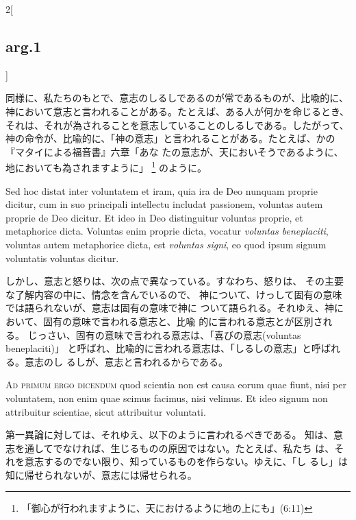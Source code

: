 \documentclass[paper=a4paper,fontsize=10pt,jafontsize=9pt,titlepage]{jlreq}
\begin{document}
\begin{paracol}{2}[\subsection{arg.1}]
\switchcolumn

同様に、私たちのもとで、意志のしるしであるのが常であるものが、比喩的に、
 神において意志と言われることがある。たとえば、ある人が何かを命じるとき、
 それは、それが為されることを意志していることのしるしである。したがって、
 神の命令が、比喩的に、「神の意志」と言われることがある。たとえば、かの
 『マタイによる福音書』六章「あな
 たの意志が、天においそうであるように、地においても為されますように」
 \footnote{「御心が行われますように、天におけるように地の上にも」(6:11)}
 のように。

\switchcolumn*


Sed hoc distat inter voluntatem et iram, quia ira
de Deo nunquam proprie dicitur, cum in suo principali intellectu
includat passionem, voluntas autem proprie de Deo dicitur. Et ideo in
Deo distinguitur voluntas proprie, et metaphorice dicta. Voluntas enim
proprie dicta, vocatur {\itshape voluntas beneplaciti}, voluntas autem metaphorice
dicta, est {\itshape voluntas signi}, eo quod ipsum signum voluntatis voluntas
dicitur.

\switchcolumn

しかし、意志と怒りは、次の点で異なっている。すなわち、怒りは、
 その主要な了解内容の中に、情念を含んでいるので、
 神について、けっして固有の意味では語られないが、意志は固有の意味で神に
 ついて語られる。それゆえ、神において、固有の意味で言われる意志と、比喩
 的に言われる意志とが区別される。
じっさい、固有の意味で言われる意志は、「喜びの意志(voluntas beneplaciti)」
 と呼ばれ、比喩的に言われる意志は、「しるしの意志」と呼ばれる。意志のし
 るしが、意志と言われるからである。

\switchcolumn*[\subsection{ad.1}]


{\scshape Ad primum ergo dicendum} quod scientia non
est causa eorum quae fiunt, nisi per voluntatem, non enim quae scimus
facimus, nisi velimus. Et ideo signum non attribuitur scientiae, sicut
attribuitur voluntati.

\switchcolumn

第一異論に対しては、それゆえ、以下のように言われるべきである。
知は、意志を通してでなければ、生じるものの原因ではない。たとえば、私たち
 は、それを意志するのでない限り、知っているものを作らない。ゆえに、「し
 るし」は知に帰せられないが、意志には帰せられる。

\switchcolumn*[\subsection{ad.2}]



\end{paracol}
\end{document}
